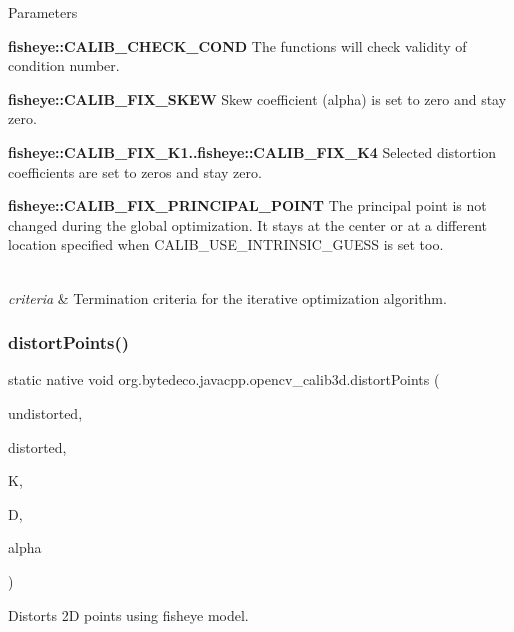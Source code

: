 \begin{DoxyParams}{Parameters}
\begin{DoxyItemize}
\item {\bfseries fisheye\+::\+C\+A\+L\+I\+B\+\_\+\+C\+H\+E\+C\+K\+\_\+\+C\+O\+ND} The functions will check validity of condition number.
\item {\bfseries fisheye\+::\+C\+A\+L\+I\+B\+\_\+\+F\+I\+X\+\_\+\+S\+K\+EW} Skew coefficient (alpha) is set to zero and stay zero.
\item {\bfseries fisheye\+::\+C\+A\+L\+I\+B\+\_\+\+F\+I\+X\+\_\+\+K1..fisheye\+::\+C\+A\+L\+I\+B\+\_\+\+F\+I\+X\+\_\+\+K4} Selected distortion coefficients are set to zeros and stay zero.
\item {\bfseries fisheye\+::\+C\+A\+L\+I\+B\+\_\+\+F\+I\+X\+\_\+\+P\+R\+I\+N\+C\+I\+P\+A\+L\+\_\+\+P\+O\+I\+NT} The principal point is not changed during the global optimization. It stays at the center or at a different location specified when C\+A\+L\+I\+B\+\_\+\+U\+S\+E\+\_\+\+I\+N\+T\+R\+I\+N\+S\+I\+C\+\_\+\+G\+U\+E\+SS is set too. 
\end{DoxyItemize}\\
\hline
{\em criteria} & Termination criteria for the iterative optimization algorithm. \\
\hline
\end{DoxyParams}
\mbox{\label{group__calib3d__fisheye_gacc047f2a04ea647d5dd504de5b1b6ba3}} 
\subsubsection{\texorpdfstring{distort\+Points()}{distortPoints()}}
{\footnotesize\ttfamily static native void org.\+bytedeco.\+javacpp.\+opencv\+\_\+calib3d.\+distort\+Points (\begin{DoxyParamCaption}\item[{@By\+Val Mat}]{undistorted,  }\item[{@By\+Val Mat}]{distorted,  }\item[{@By\+Val Mat}]{K,  }\item[{@By\+Val Mat}]{D,  }\item[{double}]{alpha }\end{DoxyParamCaption})\hspace{0.3cm}{\ttfamily [static]}}



Distorts 2D points using fisheye model. 


